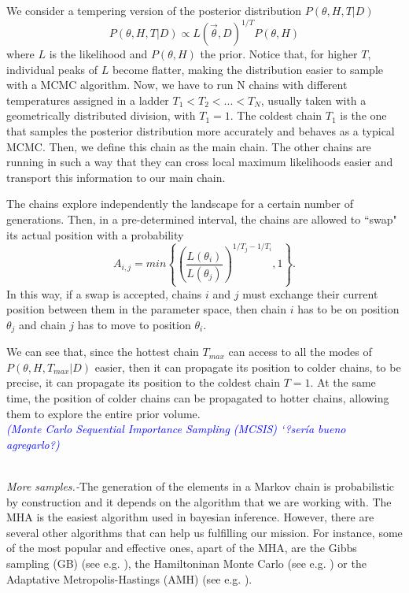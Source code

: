 \documentclass[onecolumn,           %
               showpacs,            %
               preprintnumbers,     %
               aps,                 %
               letterpaper,             %
               superscriptaddress,      %
               nofootinbib,         %
               tightenlines,        %
               floats,floatfix      %
               ,usenatbib,
               ]{revtex4-1}
\begin{document}
We consider a tempering version of the posterior distribution $P(\theta,H,T|D)$
\begin{equation}
P(\theta,H,T|D) \propto L(\vec\theta,D)^{1/T}P(\theta,H)
\end{equation}
where $L$ is the likelihood and $P(\theta,H)$ the prior. Notice that, for higher $T$, individual peaks of $L$ become flatter, making the distribution easier to sample with a MCMC algorithm. Now, we have to run N chains with different temperatures assigned in a ladder $T_1<T_2<...<T_N$, usually taken with a geometrically distributed division, with $T_1=1$. The coldest chain $T_1$ is the one that samples the posterior distribution more accurately and behaves as a typical MCMC. Then, we define this chain as the main chain. The other chains are running in such a way that they can cross local maximum likelihoods easier and transport this information to our main chain.  

The chains explore independently the landscape for a certain number of generations. Then, in a pre-determined interval, the chains are allowed to ``swap" its actual position with a probability
\begin{equation}
A_{i,j}=min\left\lbrace\left(\frac{L(\theta_i)}{L(\theta_j)}\right)^{1/T_j-1/T_i},1\right\rbrace .
\end{equation}
In this way, if a swap is accepted, chains $i$ and $j$ must exchange their current position between them in the parameter space, then chain $i$ has to be on position $\theta_j$ and chain $j$ has to move to position $\theta_i$. 

We can see that, since the hottest chain $T_{max}$ can access to all the modes of $P(\theta,H,T_{max}|D)$ easier, then it can propagate its position to colder chains, to be precise, it can propagate its position to the coldest chain $T=1$. At the same time, the position of colder chains can be propagated to hotter chains, allowing them to explore the entire prior volume.   
\\

\textit{\textcolor{blue}{(Monte Carlo Sequential Importance Sampling (MCSIS) `?ser\'ia bueno agregarlo?)}}
\\ $ $

\textit{More samples.-}The generation of the elements in a Markov chain is probabilistic by construction and it depends on the algorithm that we are working with. The MHA is the easiest algorithm used in bayesian inference. However, there are several other algorithms that can help us fulfilling our mission. For instance, some of the most popular and effective ones, apart of the MHA, are the Gibbs sampling (GB) (see e.g. \cite{gibbs1,gibbs2}), the Hamiltoninan Monte Carlo (see e.g. \cite{hamiltonian1,Hamiltonian2}) or the Adaptative Metropolis-Hastings (AMH) (see e.g. \cite{importance}).\\
 
\end{document}
